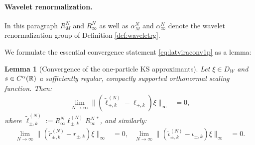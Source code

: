 \documentclass[a4paper, 11pt]{article}
\DeclareMathOperator{\1}{\mathds{1}}
\newtheorem{lemma}[thm]{Lemma}
\begin{document}
\paragraph{Wavelet renormalization.}
\label{sec:KSconvwav}
In this paragraph $R^{N}_{M}$ and $R^{N}_{\infty}$ as well as $\alpha^{N}_{M}$ and $\alpha^{N}_{\infty}$ denote the wavelet renormalization group of Definition \ref{def:waveletrg}.

We formulate the essential convergence statement \eqref{eq:latviraconv1p} as a lemma:
\begin{lemma}[Convergence of the one-particle KS approximants]
\label{lem:KSconv}
Let $\xi\in D_{W}$ and $s\in C^{\alpha}(\mathbb{R})$ a sufficiently regular, compactly supported orthonormal scaling function. Then:
\begin{align*}
\lim_{N\rightarrow\infty}\|(\tilde{\ell}^{(N)}_{\pm,k} - \ell_{\pm,k})\xi\|_{\infty} & = 0,
\end{align*}
where $\tilde{\ell}^{(N)}_{\pm,k}:=R^{N}_{\infty}\ell^{(N)}_{\pm,k}R^{N\!\ *}_{\infty}$, and similarly:
\begin{align*}
\lim_{N\rightarrow\infty}\|(\tilde{r}^{(N)}_{\pm,k} - r_{\pm,k})\xi\|_{\infty} & = 0, & \lim_{N\rightarrow\infty}\|(\tilde{\iota}^{(N)}_{\pm,k} - \iota_{\pm,k})\xi\|_{\infty} & = 0.
\end{align*} 
\end{lemma}
\end{document}
